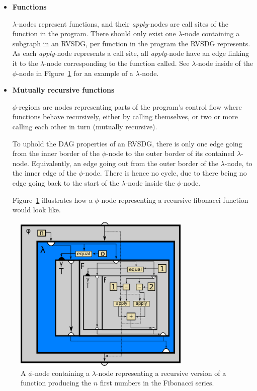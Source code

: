 \begin{itemize}
\item \textbf{Functions}

\textit{$\lambda$}-nodes represent functions, and their \textit{apply}-nodes are
call sites of the function in the program. There should only exist one
$\lambda$-node containing a subgraph in an RVSDG, per function in the program
the RVSDG represents. As each \textit{apply}-node represents a call site, all
\textit{apply}-node have an edge linking it to the $\lambda$-node corresponding
to the function called. See $\lambda$-node inside of the $\phi$-node in
Fĩgure~\ref{fig:rec_fib_phi} for an example of a $\lambda$-node.

\item \textbf{Mutually recursive functions}

\textit{$\phi$}-regions are nodes representing parts of the program's control
flow where functions behave recursively, either by calling themselves, or two or
more calling each other in turn (mutually recursive).

To uphold the DAG properties of an RVSDG, there is only one edge going from the
inner border of the $\phi$-node to the outer border of its contained
$\lambda$-node. Equivalently, an edge going out from the outer border of the
$\lambda$-node, to the inner edge of the $\phi$-node. There is hence no cycle,
due to there being no edge going back to the start of the $\lambda$-node inside
the $\phi$-node.

Figure~\ref{fig:rec_fib_phi} illustrates how a $\phi$-node representing a
recursive fibonacci function would look like.

\end{itemize}

\begin{figure}[h]
	\centering
	\includegraphics[width=0.75\textwidth]{figures/recursive_fibonacci}
	\caption{A $\phi$-node containing a $\lambda$-node representing a recursive
version of a function producing the $n$ first numbers in the Fibonacci series.}
	\label{fig:rec_fib_phi}
\end{figure}
